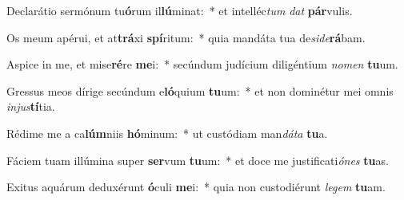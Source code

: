 \item Declarátio sermónum tu\textbf{ó}rum il\textbf{lú}minat:~* et intelléc\textit{tum} \textit{dat} \textbf{pár}vulis.
\item Os meum apérui, et at\textbf{trá}xi \textbf{spí}ritum:~* quia mandáta tua de\textit{si}\textit{de}\textbf{rá}bam.
\item Aspice in me, et mise\textbf{ré}re \textbf{me}i:~* secúndum judícium diligéntium \textit{no}\textit{men} \textbf{tu}um.
\item Gressus meos dírige secúndum e\textbf{ló}quium \textbf{tu}um:~* et non dominétur mei omnis \textit{in}\textit{jus}\textbf{tí}tia.
\item Rédime me a ca\textbf{lúm}niis \textbf{hó}minum:~* ut custódiam man\textit{dá}\textit{ta} \textbf{tu}a.
\item Fáciem tuam illúmina super \textbf{ser}vum \textbf{tu}um:~* et doce me justificati\textit{ó}\textit{nes} \textbf{tu}as.
\item Exitus aquárum deduxérunt \textbf{ó}culi \textbf{me}i:~* quia non custodiérunt \textit{le}\textit{gem} \textbf{tu}am.
